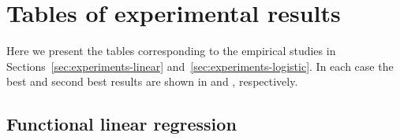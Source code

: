 %
%

\setlength{\voffset}{-.6cm}
\setlength{\footskip}{95pt}

\chapter{Tables of experimental results}\label{ch:tables}

\enlargethispage{10\baselineskip}

Here we present the tables corresponding to the empirical studies in Sections~\ref{sec:experiments-linear} and~\ref{sec:experiments-logistic}. In each case the best and second best results are shown in  and , respectively.

\section*{Functional linear regression}

